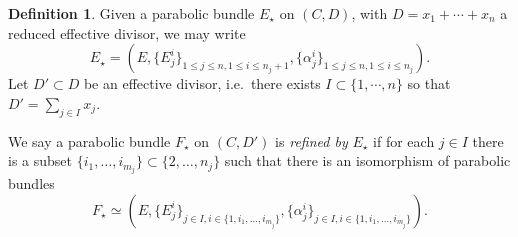 \documentclass[12 pt]{amsart}
\theoremstyle{plain}
\theoremstyle{definition}
\newtheorem{definition}[subsubsection]{Definition}
\theoremstyle{remark}
\numberwithin{equation}{section}
\begin{document}
\begin{definition}
	\label{definition:refinements}
	Given a parabolic bundle $E_\star$ on $(C,D)$, with $D=x_1+ \cdots+ x_n$ a reduced effective divisor, we may write $$E_\star= (E, \{E^i_j\}_{1 \leq j \leq n,
	1\leq i \leq n_j+1}, \{\alpha^i_j\}_{1 \leq j \leq n,
1\leq i \leq n_j}).$$
Let $D'\subset D$ be an effective divisor, i.e.~there exists $I\subset \{1, \cdots, n\}$ so that $D'=\sum_{j\in I} x_j$. 

We say a parabolic bundle $F_\star$ on $(C, D')$ is {\em refined by} $E_\star$ if for each $j\in I$ there is a subset $\{i_1, \ldots, i_{m_j}\} \subset
\{2, \ldots, n_j\}$ such that there is an isomorphism of parabolic bundles
$$F_\star \simeq  
(E, \{E^i_j\}_{j \in I, i \in \{1, i_1, \ldots, i_{m_j}\} },
\{\alpha^i_j\}_{j \in I, i \in \{1, i_1, \ldots, i_{m_j}\} }).$$
\end{definition}
\end{document}
